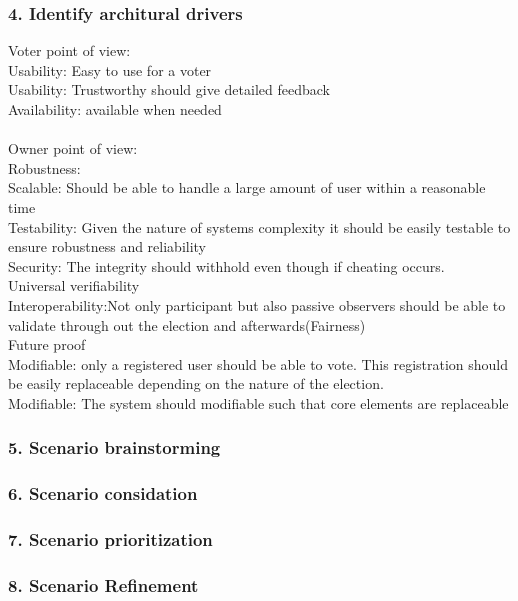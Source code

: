 \subsubsection{4. Identify architural drivers}
Voter point of view: \\
Usability: Easy to use for a voter\\
Usability: Trustworthy should give detailed feedback\\
Availability: available when needed\\\\


\noindent
Owner point of view:\\

\noindent
Robustness:\\
Scalable: Should be able to handle a large amount of user within a reasonable time\\
Testability: Given the nature of systems complexity it should be easily testable to ensure robustness and reliability\\
Security: The integrity should withhold even though if cheating occurs.\\

\noindent
Universal verifiability\\
Interoperability:Not only participant but also passive observers should be able to validate through out the election and afterwards(Fairness)\\


\noindent
Future proof\\
Modifiable: only a registered user should be able to vote. This registration should be easily replaceable depending on the nature of the election.\\
Modifiable: The system should modifiable such that core elements are replaceable\\








\subsubsection{5. Scenario brainstorming}

\subsubsection{6. Scenario considation}

\subsubsection{7. Scenario prioritization}

\subsubsection{8. Scenario Refinement}
        